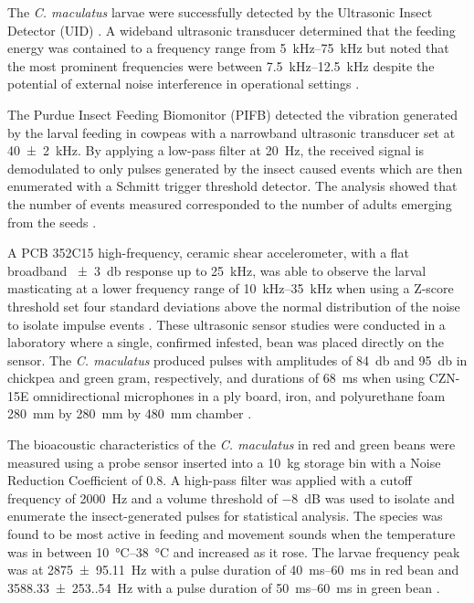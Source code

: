 \documentclass[../Vibro-Acoustic Signatures and Detection Algorithms for Stored Product Insects.tex]{subfiles}
\begin{document}
The \textit{C. maculatus} larvae were successfully detected by the Ultrasonic Insect Detector (UID) \cite{shadeDetectionHiddenInsect1990}. A wideband ultrasonic transducer determined that the feeding energy was contained to a frequency range from \SIrange{5}{75}{\kilo\hertz} but noted that the most prominent frequencies were between \SIrange{7.5}{12.5}{\kilo\hertz} despite the potential of external noise interference in operational settings \cite{klaassenCharacterizationUltrasonicSignals1988}.

The Purdue Insect Feeding Biomonitor (PIFB) detected the vibration generated by the larval feeding in cowpeas with a narrowband ultrasonic transducer set at \SI{40(2)}{\kilo\hertz}. By applying a low-pass filter at \SI{20}{\hertz}, the received signal is demodulated to only pulses generated by the insect caused events which are then enumerated with a Schmitt trigger threshold detector. The analysis showed that the number of events measured corresponded to the number of adults emerging from the seeds \cite{shadeDetectionHiddenInsect1990}.

A PCB 352C15 high-frequency, ceramic shear accelerometer, with a flat broadband \SI{+-3}{\decibel} response up to \SI{25}{\kilo\hertz}, was able to observe the larval masticating at a lower frequency range of \SIrange{10}{35}{\kilo\hertz} when using a Z-score threshold set four standard deviations above the normal distribution of the noise to isolate impulse events \cite{bittnerMonitoringCowpeaBruchid2018}. These ultrasonic sensor studies were conducted in a laboratory where a single, confirmed infested, bean was placed directly on the sensor. The \textit{C. maculatus} produced pulses with amplitudes of \SI{84}{\decibel} and \SI{95}{\decibel} in chickpea and green gram, respectively, and durations of \SI{68}{\milli\second} when using CZN-15E omnidirectional microphones in a ply board, iron, and polyurethane foam \SI{280}{\milli\meter} by \SI{280}{\milli\meter} by \SI{480}{\milli\meter} chamber \cite{bangaBioacousticDetectionCallosobruchus2019}.

The bioacoustic characteristics of the \textit{C. maculatus} in red and green beans were measured using a probe sensor inserted into a \SI{10}{\kilo\gram} storage bin with a Noise Reduction Coefficient of 0.8. A high-pass filter was applied with a cutoff frequency of \SI{2000}{\hertz} and a volume threshold of \SI{-8}{\deci\bel} was used to isolate and enumerate the insect-generated pulses for statistical analysis. The species was found to be most active in feeding and movement sounds when the temperature was in between \SIrange{10}{38}{\degreeCelsius} and increased as it rose. The larvae frequency peak was at \SI{2875(95.11)}{\hertz} with a pulse duration of \SIrange{40}{60}{\milli\second} in red bean and \SI{3588.33(253.54)}{\hertz} with a pulse duration of \SIrange{50}{60}{\milli\second} in green bean \cite{changBioacousticDetectionFour2025}.
\end{document}
